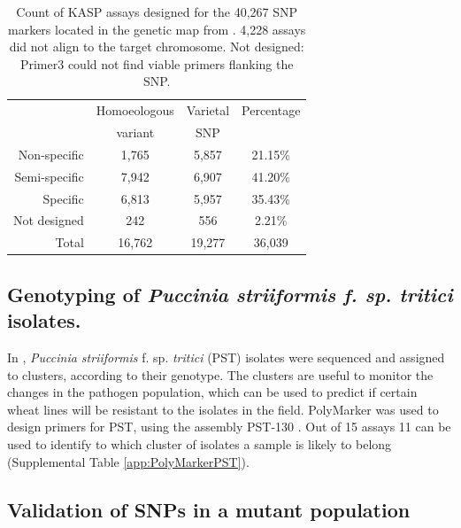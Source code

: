 \begin{table}

\centering
\caption{Count of KASP assays designed for the 40,267 SNP markers located in the genetic map from \cite{Wang2014}. 4,228 assays did not align to the target chromosome. \label{tab:poly:designed} Not designed: Primer3 could not find viable primers flanking the SNP.}

\begin{tabular}{rccc}

\toprule
 & Homoeologous  &     Varietal  & Percentage\\
  &  variant &      SNP & \\
 \midrule
Non-specific&1,765&5,857&21.15\%\\
Semi-specific&7,942&6,907&41.20\%\\
Specific&6,813&5,957&35.43\%\\
Not designed &242&556&2.21\%\\
\midrule
 Total&16,762&19,277&36,039\\
\bottomrule
\end{tabular}

\end{table}

\subsection{Genotyping of \textit{Puccinia 
striiformis f. sp. tritici} isolates.}
In \cite{Hubbard2015}, \textit{Puccinia striiformis} f. sp. \textit{tritici} (PST) isolates were sequenced and assigned to clusters, according to their genotype.
The clusters are useful to monitor the changes in the pathogen population, which can be used to predict if certain wheat lines will be resistant to the isolates in the field. 
PolyMarker was used to design primers for PST, using the assembly PST-130 \cite{Cantu2011}.
Out of 15 assays 11 can be used to identify to which cluster of isolates a sample is likely to belong (Supplemental Table \ref{app:PolyMarkerPST}).  




\subsection{Validation of SNPs in a mutant population}
\citep{Krasileva2016}


